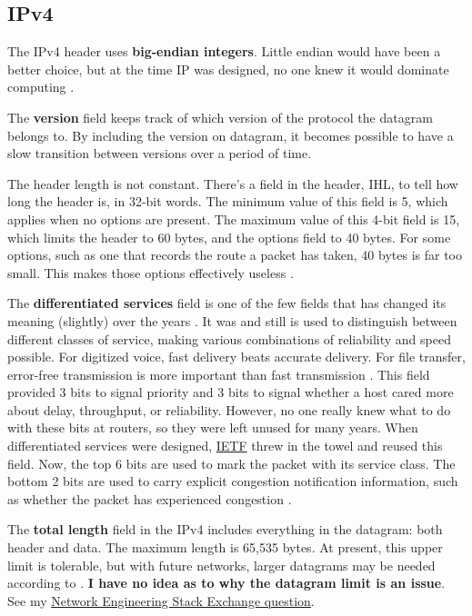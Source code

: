 \documentclass[12pt, oneside]{book}
\begin{document}
\subsection{IPv4}

The IPv4 header uses \textbf{big-endian integers}. Little endian would have been a better choice, but at the time IP was designed, no one knew it would dominate computing \cite{computer-networks-tanenbaum-2012}.

The \textbf{version} field keeps track of which version of the protocol the datagram belongs to. By including the version on datagram, it becomes possible to have a slow transition between versions over a period of time.

The header length is not constant. There's a field in the header, IHL, to tell how long the header is, in 32-bit words. The minimum value of this field is 5, which applies when no options are present.
The maximum value of this 4-bit field is 15, which limits the header to 60 bytes, and the options field to 40 bytes. For some options, such as one that records the route a packet has taken, 40 bytes is far too small.
This makes those options effectively useless \cite{computer-networks-tanenbaum-2012}.

The \textbf{differentiated services} field is one of the few fields that has changed its meaning (slightly) over the years \cite{computer-networks-tanenbaum-2012}.
It was and still is used to distinguish between different classes of service, making various combinations of reliability and speed possible.
For digitized voice, fast delivery beats accurate delivery.
For file transfer, error-free transmission is more important than fast transmission \cite{computer-networks-tanenbaum-2012}.
This field provided 3 bits to signal priority and 3 bits to signal whether a host cared more about delay, throughput, or reliability.
However, no one really knew what to do with these bits at routers, so they were left unused for many years.
When differentiated services were designed, \href{https://en.wikipedia.org/wiki/Internet_Engineering_Task_Force}{IETF} threw in the towel and reused this field.
Now, the top 6 bits are used to mark the packet with its service class.
The bottom 2 bits are used to carry explicit congestion notification information, such as whether the packet has experienced congestion \cite{computer-networks-tanenbaum-2012}.

The \textbf{total length} field in the IPv4 includes everything in the datagram: both header and data.
The maximum length is 65,535 bytes. At present, this upper limit is tolerable, but with future networks, larger datagrams may be needed according to \cite{computer-networks-tanenbaum-2012}.
\textbf{I have no idea as to why the datagram limit is an issue}.
See my \href{https://networkengineering.stackexchange.com/questions/54480/why-is-the-ip-datagram-total-length-an-issue}{Network Engineering Stack Exchange question}.
\end{document}
